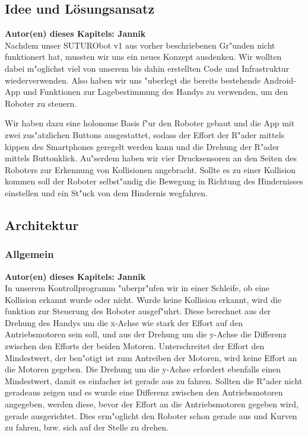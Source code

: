 \documentclass[8pt]{article}
\newcommand{\secauthor}[1]{\textbf{Autor(en) dieses Kapitels: {#1}}\\}
\begin{document}
\subsection{Idee und Lösungsansatz} 
\secauthor{Jannik}
Nachdem unser SUTURObot v1 aus vorher beschriebenen Gr"unden nicht funktionert hat, mussten wir uns ein neues Konzept ausdenken. Wir wollten dabei m"oglichst viel von unserem bis dahin erstellten Code und Infrastruktur wiederverwenden. Also haben wir uns "uberlegt die bereits bestehende Android-App und Funktionen zur Lagebestimmung des Handys zu verwenden, um den Roboter zu steuern.

Wir haben dazu eine holonome Basis f"ur den Roboter gebaut und die App mit zwei zus"atzlichen Buttons ausgestattet, sodass der Effort der R"ader mittels kippen des Smartphones geregelt werden kann und die Drehung der R"ader mittels Buttonklick. Au"serdem haben wir vier Drucksensoren an den Seiten des Roboters zur Erkennung von Kollisionen angebracht. Sollte es zu einer Kollision kommen soll der Roboter selbst"andig die Bewegung in Richtung des Hindernisses einstellen und ein St"uck von dem Hindernis wegfahren.

\subsection{Architektur}

\subsubsection{Allgemein}
\secauthor{Jannik}
In unserem Kontrollprogramm "uberpr"ufen wir in einer Schleife, ob eine Kollision erkannt wurde oder nicht. Wurde keine Kollision erkannt, wird die funktion zur Steuerung des Roboter ausgef"uhrt. Diese berechnet aus der Drehung des Handys um die x-Achse wie stark der Effort auf den Antriebsmotoren sein soll, und aus der Drehung um die y-Achse die Differenz zwischen den Efforts der beiden Motoren. Unterschreitet der Effort den Mindestwert, der ben"otigt ist zum Antreiben der Motoren, wird keine Effort an die Motoren gegeben. Die Drehung um die y-Achse erfordert ebenfalls einen Mindestwert, damit es einfacher ist gerade aus zu fahren. Sollten die R"ader nicht geradeaus zeigen und es wurde eine Differenz zwischen den Antriebsmotoren angegeben, werden diese, bevor der Effort an die Antriebsmotoren gegeben wird, gerade ausgerichtet. 
Dies erm"oglicht den Roboter schon gerade aus und Kurven zu fahren, bzw. sich auf der Stelle zu drehen.
\end{document}
